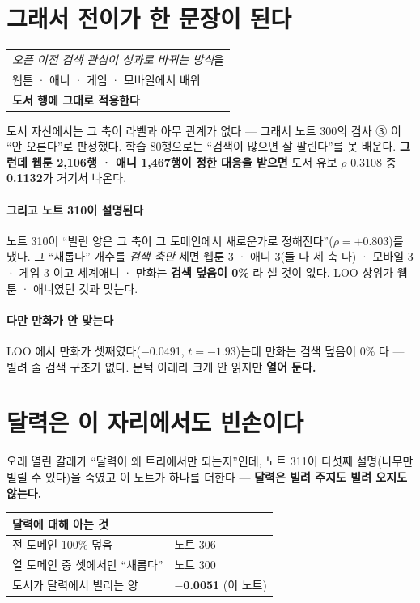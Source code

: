 \documentclass[10pt]{article}
\begin{document}
\section{그래서 전이가 한 문장이 된다}

\begin{center}\small
\begin{tabular}{l}
\hline
\emph{오픈 이전 검색 관심이 성과로 바뀌는 방식}을 \\
웹툰 · 애니 · 게임 · 모바일에서 배워 \\
\textbf{도서 행에 그대로 적용한다} \\
\hline
\end{tabular}
\end{center}

도서 자신에서는 그 축이 라벨과 아무 관계가 없다 --- 그래서 노트 300의 검사
③ 이 ``안 오른다''로 판정했다. 학습 80행으로는 ``검색이 많으면 잘 팔린다''를
못 배운다. \textbf{그런데 웹툰 2,106행 · 애니 1,467행이 정한 대응을 받으면}
도서 유보 $\rho$ 0.3108 중 \textbf{0.1132}가 거기서 나온다.

\paragraph{그리고 노트 310이 설명된다} 노트 310이 ``빌린 양은 그 축이 그
도메인에서 새로운가로 정해진다''($\rho{=}{+}0.803$)를 냈다. 그 ``새롭다''
개수를 \emph{검색 축만} 세면 웹툰 3 · 애니 3(둘 다 세 축 다) · 모바일 3 ·
게임 3 이고 세계애니 · 만화는 \textbf{검색 덮음이 0\%} 라 셀 것이 없다.
LOO 상위가 웹툰 · 애니였던 것과 맞는다.

\paragraph{다만 만화가 안 맞는다} LOO 에서 만화가 셋째였다($-$0.0491,
$t{=}{-}1.93$)는데 만화는 검색 덮음이 0\% 다 --- 빌려 줄 검색 구조가 없다.
문턱 아래라 크게 안 읽지만 \textbf{열어 둔다.}

\section{달력은 이 자리에서도 빈손이다}

오래 열린 갈래가 ``달력이 왜 트리에서만 되는지''인데, 노트 311이 다섯째
설명(나무만 빌릴 수 있다)을 죽였고 이 노트가 하나를 더한다 ---
\textbf{달력은 빌려 주지도 빌려 오지도 않는다.}

\begin{center}\footnotesize
\begin{tabular}{ll}
\hline
달력에 대해 아는 것 & \\
\hline
전 도메인 100\% 덮음 & 노트 306 \\
열 도메인 중 셋에서만 ``새롭다'' & 노트 300 \\
도서가 달력에서 빌리는 양 & \textbf{$-$0.0051} (이 노트) \\
\hline
\end{tabular}
\end{center}
\end{document}
